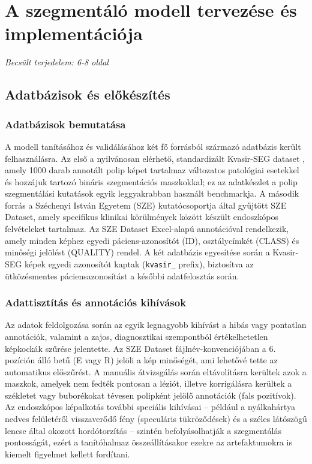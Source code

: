 \documentclass[12pt, a4paper]{report}
\begin{document}
\chapter{A szegmentáló modell tervezése és implementációja}
\textit{Becsült terjedelem: 6-8 oldal}

\section{Adatbázisok és előkészítés}

\subsection{Adatbázisok bemutatása}
A modell tanításához és validálásához két fő forrásból származó adatbázis került felhasználásra. Az első a nyilvánosan elérhető, standardizált Kvasir-SEG dataset \cite{kvasir_seg}, amely 1000 darab annotált polip képet tartalmaz változatos patológiai esetekkel és hozzájuk tartozó bináris szegmentációs maszkokkal; ez az adatkészlet a polip szegmentálási kutatások egyik leggyakrabban használt benchmarkja. A második forrás a Széchenyi István Egyetem (SZE) kutatócsoportja által gyűjtött SZE Dataset, amely specifikus klinikai körülmények között készült endoszkópos felvételeket tartalmaz. Az SZE Dataset Excel-alapú annotációval rendelkezik, amely minden képhez egyedi páciens-azonosítót (ID), osztálycímkét (CLASS) és minőségi jelölést (QUALITY) rendel. A két adatbázis egyesítése során a Kvasir-SEG képek egyedi azonosítót kaptak (\texttt{kvasir\_} prefix), biztosítva az ütközésmentes páciensazonosítást a későbbi adatfelosztás során.

\subsection{Adattisztítás és annotációs kihívások}
Az adatok feldolgozása során az egyik legnagyobb kihívást a hibás vagy pontatlan annotációk, valamint a zajos, diagnosztikai szempontból értékelhetetlen képkockák szűrése jelentette. Az SZE Dataset fájlnév-konvenciójában a 6. pozíción álló betű (E vagy R) jelöli a kép minőségét, ami lehetővé tette az automatikus előszűrést. A manuális átvizsgálás során eltávolításra kerültek azok a maszkok, amelyek nem fedték pontosan a léziót, illetve korrigálásra kerültek a székletet vagy buborékokat tévesen polipként jelölő annotációk (fals pozitívok). Az endoszkópos képalkotás további speciális kihívásai -- például a nyálkahártya nedves felületéről visszaverődő fény (speculáris tükröződések) és a széles látószögű lencse által okozott hordótorzítás -- szintén befolyásolhatják a szegmentálás pontosságát, ezért a tanítóhalmaz összeállításakor ezekre az artefaktumokra is kiemelt figyelmet kellett fordítani.
\end{document}
